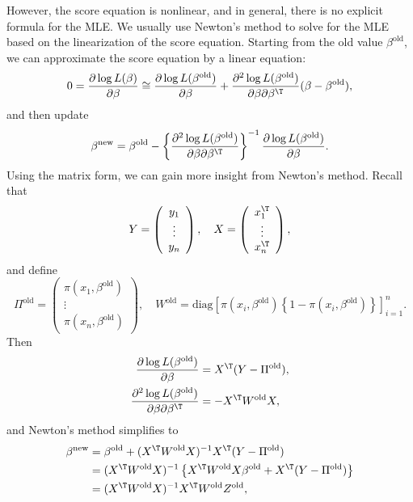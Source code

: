 However, the score equation is nonlinear, and in general, there is
no explicit formula for the MLE. We usually use Newton's method to
solve for the MLE based on the linearization of the score equation. Starting from the old value $\beta^{\text{old}}$, we can approximate the score equation by a linear equation:
\[
0=\frac{\partial\log L( \beta )}{\partial\beta}\cong\frac{\partial\log L(\beta^{\text{old}})}{\partial\beta}+\frac{\partial^{2}\log L(\beta^{\text{old}})}{\partial\beta\partial\beta^{\T}}(\beta-\beta^{\text{old}}),
\]
and then update
\[
\beta^{\text{new}}=\beta^{\text{old}}-\left\{ \frac{\partial^{2}\log L(\beta^{\text{old}})}{\partial\beta\partial\beta^{\T}}\right\} ^{-1}\frac{\partial\log L(\beta^{\text{old}})}{\partial\beta}.
\]
Using the matrix form, we can gain more insight from Newton's method.
Recall that 
$$
Y=\left(\begin{array}{c}
y_{1}\\
\vdots\\
y_{n}
\end{array}\right), \quad  X=\left(\begin{array}{c}
x_{1}^{\T}\\
\vdots\\
x_{n}^{\T}
\end{array}\right),
$$
and define 
$$
\Pi^{\text{old}}=\left(\begin{array}{c}
\pi(x_{1},\beta^{\text{old}})\\
\vdots\\
\pi(x_{n},\beta^{\text{old}})
\end{array}\right), \quad
 W^{\text{old}}=\text{diag}\left[\pi(x_{i},\beta^{\text{old}})\left\{ 1-\pi(x_{i},\beta^{\text{old}})\right\} \right]_{i=1}^{n}.
$$ 
Then 
\begin{align*}
\frac{\partial\log L(\beta^{\text{old}})}{\partial\beta} & =X^{\T}(Y  - \Pi^{\text{old}}),\\
\frac{\partial^{2}\log L(\beta^{\text{old}})}{\partial\beta\partial\beta^{\T}} & =-X^{\T}W^{\text{old}}X,
\end{align*}
and Newton's method simplifies to
\begin{align*}
\beta^{\text{new}} & =\beta^{\text{old}}+(X^{\T}W^{\text{old}}X)^{-1}X^{\T}(Y-\Pi^{\text{old}})\\
 & =(X^{\T}W^{\text{old}}X)^{-1}\left\{ X^{\T}W^{\text{old}}X\beta^{\text{old}}+X^{\T}(Y-\Pi^{\text{old}})\right\} \\
 & =(X^{\T}W^{\text{old}}X)^{-1}X^{\T}W^{\text{old}}Z^{\text{old}},
\end{align*}
